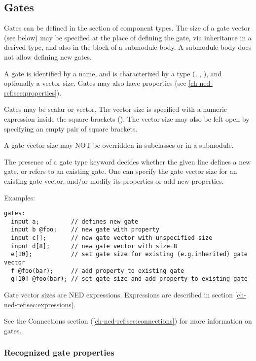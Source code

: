 \subsection{Gates}
\label{ch-ned-ref:sec:gates}

Gates can be defined in the  section of component types.
The size of a gate vector (see below) may be specified at the place of
defining the gate, via inheritance in a derived type, and also in the
 block of a submodule body. A submodule body does not allow
defining new gates.

A gate is identified by a name, and is characterized by a type
(, , ), and optionally a
vector size. Gates may also have properties (see
\ref{ch-ned-ref:sec:properties}).

Gates may be scalar or vector. The vector size is specified with a numeric
expression inside the square brackets (\ttt{[...]}). The vector size may
also be left open by specifying an empty pair of square brackets.

A gate vector size may NOT be overridden in subclasses or in a submodule.

The presence of a gate type keyword decides whether the given line defines
a new gate, or refers to an existing gate. One can specify the gate vector
size for an existing gate vector, and/or modify its properties or add new
properties.

Examples:

\begin{verbatim}
gates:
  input a;         // defines new gate
  input b @foo;    // new gate with property
  input c[];       // new gate vector with unspecified size
  input d[8];      // new gate vector with size=8
  e[10];           // set gate size for existing (e.g.inherited) gate vector
  f @foo(bar);     // add property to existing gate
  g[10] @foo(bar); // set gate size and add property to existing gate
\end{verbatim}

Gate vector sizes are NED expressions. Expressions are described in section
\ref{ch-ned-ref:sec:expressions}.

See the Connections section (\ref{ch-ned-ref:sec:connections}) for more
information on gates.

\subsubsection{Recognized gate properties}

